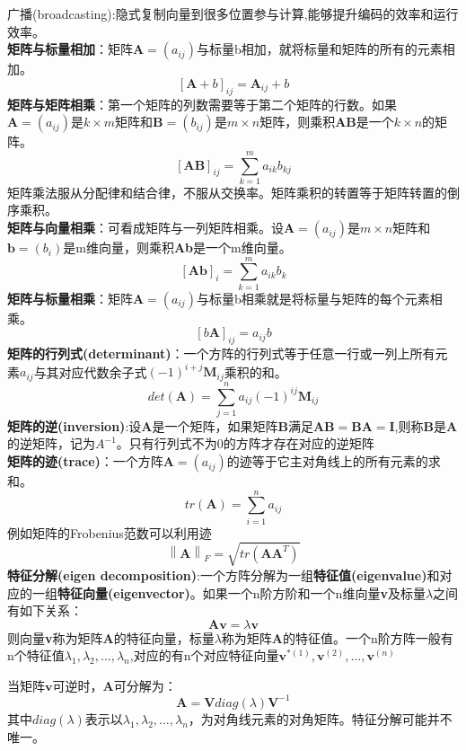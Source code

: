 \documentclass[openbib]{article}
\begin{document}
广播(broadcasting):隐式复制向量到很多位置参与计算,能够提升编码的效率和运行效率。
\\\textbf{矩阵与标量相加}：矩阵$\textbf{A}=(a_{ij})$与标量b相加，就将标量和矩阵的所有的元素相加。
$$[\textbf{A}+b]_{ij}=\textbf{A}_{ij}+b$$
\textbf{矩阵与矩阵相乘}：第一个矩阵的列数需要等于第二个矩阵的行数。如果$\textbf{A}=(a_{ij})$是$k\times m$矩阵和$\textbf{B}=(b_{ij})$是$m\times n$矩阵，则乘积\textbf{AB}是一个$k\times n$的矩阵。
$$[\textbf{AB}]_{ij}=\sum_{k=1}^{m}a_{ik}b_{kj}$$
矩阵乘法服从分配律和结合律，不服从交换率。矩阵乘积的转置等于矩阵转置的倒序乘积。
\\\textbf{矩阵与向量相乘}：可看成矩阵与一列矩阵相乘。设$\textbf{A}=(a_{ij})$是$m\times n$矩阵和$\textbf{b}=(b_{i})$是m维向量，则乘积\textbf{Ab}是一个m维向量。
$$[\textbf{Ab}]_{i}=\sum_{k=1}^{m}a_{ik}b_{k}$$
\textbf{矩阵与标量相乘}：矩阵$\textbf{A}=(a_{ij})$与标量b相乘就是将标量与矩阵的每个元素相乘。
$$[b\textbf{A}]_{ij}=a_{ij}b$$
\textbf{矩阵的行列式(determinant)}：一个方阵的行列式等于任意一行或一列上所有元素$a_{ij}$与其对应代数余子式$(-1)^{i+j}\textbf{M}_{ij}$乘积的和。
$$det(\textbf{A})=\sum_{j=1}^{n}a_{ij}(-1)^{ij}\textbf{M}_{ij}$$
\textbf{矩阵的逆(inversion)}:设\textbf{A}是一个矩阵，如果矩阵\textbf{B}满足$\textbf{AB}=\textbf{BA}=\textbf{I}$,则称\textbf{B}是\textbf{A}的逆矩阵，记为$A^{-1}$。只有行列式不为0的方阵才存在对应的逆矩阵
\\\textbf{矩阵的迹(trace)}：一个方阵$\textbf{A}=(a_{ij})$的迹等于它主对角线上的所有元素的求和。
$$tr(\textbf{A})=\sum_{i=1}^{n}a_{ij}$$
例如矩阵的Frobenius范数可以利用迹
$$\left\| \textbf{A} \right\|_{F}=\sqrt{tr(\textbf{A}\textbf{A}^T)}$$
\textbf{特征分解(eigen decomposition)}:一个方阵分解为一组\textbf{特征值(eigenvalue)}和对应的一组\textbf{特征向量(eigenvector)}。如果一个n阶方阶和一个n维向量\textbf{v}及标量$\lambda$之间有如下关系：$$\textbf{Av}=\lambda\textbf{v}$$
则向量\textbf{v}称为矩阵\textbf{A}的特征向量，标量$\lambda$称为矩阵\textbf{A}的特征值。一个n阶方阵一般有n个特征值$\lambda_1,\lambda_2,...,\lambda_n$,对应的有n个对应特征向量$\textbf{v}^{*(1)},\textbf{v}^{(2)},...,\textbf{v}^{(n)}$

当矩阵$\textbf{v}$可逆时，\textbf{A}可分解为：$$\textbf{A}=\textbf{V}diag(\lambda)\textbf{V}^{-1}$$
其中$diag(\lambda)$表示以$\lambda_1,\lambda_2,...,\lambda_n$，为对角线元素的对角矩阵。特征分解可能并不唯一。
\end{document}
